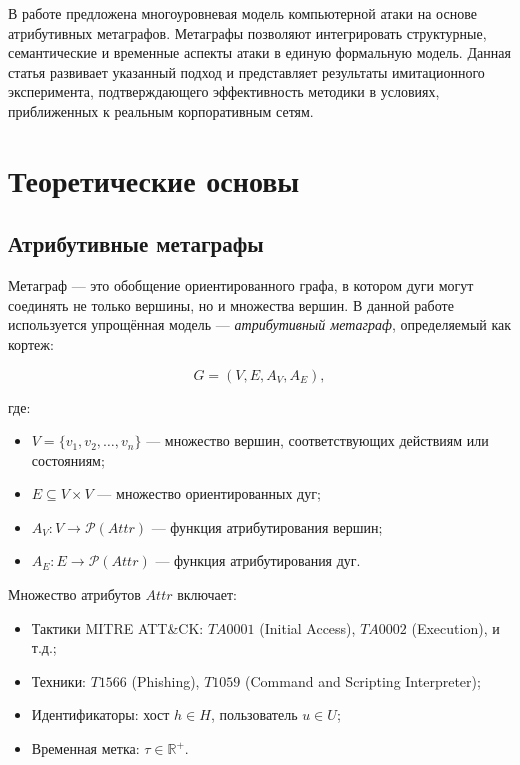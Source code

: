 \documentclass[12pt,a4paper]{article}
\begin{document}
В работе \cite{latypov2020} предложена многоуровневая модель компьютерной атаки на основе атрибутивных метаграфов. Метаграфы позволяют интегрировать структурные, семантические и временные аспекты атаки в единую формальную модель. Данная статья развивает указанный подход и представляет результаты имитационного эксперимента, подтверждающего эффективность методики в условиях, приближенных к реальным корпоративным сетям.

\section{Теоретические основы}

\subsection{Атрибутивные метаграфы}

Метаграф — это обобщение ориентированного графа, в котором дуги могут соединять не только вершины, но и множества вершин. В данной работе используется упрощённая модель — \textit{атрибутивный метаграф}, определяемый как кортеж:

\begin{equation}
G = (V, E, A_V, A_E),
\end{equation}

где:
\begin{itemize}[leftmargin=*,noitemsep]
    \item $V = \{v_1, v_2, \dots, v_n\}$ — множество вершин, соответствующих действиям или состояниям;
    \item $E \subseteq V \times V$ — множество ориентированных дуг;
    \item $A_V: V \rightarrow \mathcal{P}(Attr)$ — функция атрибутирования вершин;
    \item $A_E: E \rightarrow \mathcal{P}(Attr)$ — функция атрибутирования дуг.
\end{itemize}

Множество атрибутов $Attr$ включает:
\begin{itemize}[leftmargin=*,noitemsep]
    \item Тактики MITRE ATT\&CK: $TA0001$ (Initial Access), $TA0002$ (Execution), и т.д.;
    \item Техники: $T1566$ (Phishing), $T1059$ (Command and Scripting Interpreter);
    \item Идентификаторы: хост $h \in H$, пользователь $u \in U$;
    \item Временная метка: $\tau \in \mathbb{R}^+$.
\end{itemize}
\end{document}
